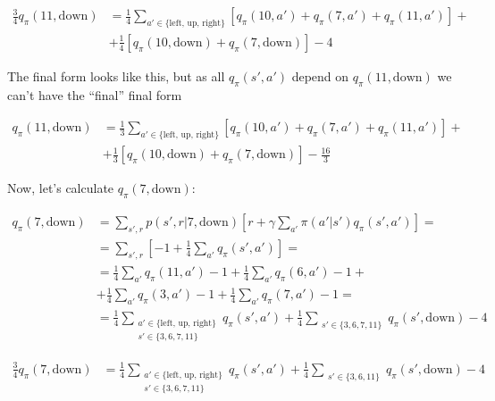\documentclass[12pt]{article}
\begin{document}
        \begin{align*}
            \frac{3}{4}q_\pi(11,\text{down}) &= \frac{1}{4} \sum\limits_{a' \in \{\text{left, up, right}\}} [q_\pi(10,a') + q_\pi(7,a') + q_\pi(11,a')] +\\
            & + \frac{1}{4} [q_\pi(10,\text{down}) + q_\pi(7,\text{down})] - 4
        \end{align*}

        The final form looks like this, but as all $q_\pi(s', a')$ depend on $q_\pi(11,\text{down})$ we can't have the ``final'' final form

        \begin{align*}
            q_\pi(11,\text{down}) &= \frac{1}{3} \sum\limits_{a' \in \{\text{left, up, right}\}} [q_\pi(10,a') + q_\pi(7,a') + q_\pi(11,a')] +\\
            & + \frac{1}{3} [q_\pi(10,\text{down}) + q_\pi(7,\text{down})] - \frac{16}{3}
        \end{align*}

        Now, let's calculate $q_\pi(7, \text{down})$:

        \begin{align*}
            q_\pi(7,\text{down}) &= \sum\limits_{s',r} p(s',r|7,\text{down})[r +
            \gamma \sum\limits_{a'} \pi(a'|s') q_\pi(s',a')] =\\
            & = \sum\limits_{s',r} [-1 + \frac{1}{4} \sum\limits_{a'} q_\pi(s',a')] =\\
            & = \frac{1}{4} \sum\limits_{a'} q_\pi(11,a') - 1 +
            \frac{1}{4} \sum\limits_{a'} q_\pi(6,a') - 1 +\\
            & + \frac{1}{4} \sum\limits_{a'} q_\pi(3,a') - 1 +
            \frac{1}{4} \sum\limits_{a'} q_\pi(7,a') - 1 =\\
            & = \frac{1}{4} \sum\limits_{\substack{a' \in \{\text{left, up, right}\} \\ s' \in \{3, 6, 7, 11\}}} q_\pi(s',a') + \frac{1}{4} \sum\limits_{\substack{s' \in \{3, 6, 7, 11\}}} q_\pi(s',\text{down}) - 4
        \end{align*}

        \begin{align*}
            \frac{3}{4}q_\pi(7,\text{down}) &= \frac{1}{4} \sum\limits_{\substack{a' \in \{\text{left, up, right}\} \\ s' \in \{3, 6, 7, 11\}}} q_\pi(s',a') + \frac{1}{4} \sum\limits_{\substack{s' \in \{3, 6, 11\}}} q_\pi(s',\text{down}) - 4
        \end{align*}
\end{document}
